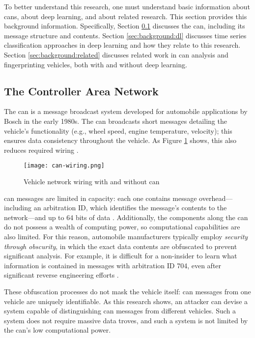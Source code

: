 \documentclass[../main.tex]{subfiles}
\begin{document}

To better understand this research, one must understand basic information about \aclp{can}, about deep learning, and about related research. This section provides this background information. Specifically, Section \ref{sec:background:can} discusses the \acl{can}, including its message structure and contents. Section \ref{sec:background:dl} discusses time series classification approaches in deep learning and how they relate to this research. Section \ref{sec:background:related} discusses related work in \ac{can} analysis and fingerprinting vehicles, both with and without deep learning.

\subsection{The Controller Area Network}\label{sec:background:can}

The \acl{can} is a message broadcast system developed for automobile applications by Bosch in the early 1980s. The \ac{can} broadcasts short messages detailing the vehicle's functionality (e.g., wheel speed, engine temperature, velocity); this ensures data consistency throughout the vehicle. As Figure \ref{diagram:can-wiring} shows, this also reduces required wiring \cite{National-Instruments}.

\begin{figure}
    \centerline{\texttt{[image: can-wiring.png]}}
    \caption{Vehicle network wiring with and without \ac{can}}
    \label{diagram:can-wiring}
\end{figure}

\ac{can} messages are limited in capacity: each one contains message overhead---including an arbitration ID, which identifies the message's contents to the network---and up to 64 bits of data \cite{Bosch1991, TexasInstruments2002}. Additionally, the components along the \ac{can} do not possess a wealth of computing power, so computational capabilities are also limited. For this reason, automobile manufacturers typically employ \textit{security through obscurity}, in which the exact data contents are obfuscated to prevent significant analysis. For example, it is difficult for a non-insider to learn what information is contained in messages with arbitration ID 704, even after significant reverse engineering efforts \cite{Buttigieg2017, Stone2018}. 

These obfuscation processes do not mask the vehicle itself: \ac{can} messages from one vehicle are uniquely identifiable. As this research shows, an attacker can devise a system capable of distinguishing \ac{can} messages from different vehicles. Such a system does not require massive data troves, and such a system is not limited by the \ac{can}'s low computational power. 
\end{document}
